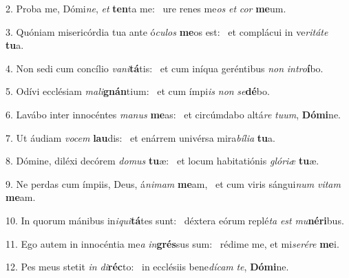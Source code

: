 2. Proba me, Dómi\textit{ne}, \textit{et} \textbf{ten}ta me: \ast\  ure renes me\textit{os} \textit{et} \textit{cor} \textbf{me}um.\

3. Quóniam misericórdia tua ante ó\textit{cu}\textit{los} \textbf{me}os est: \ast\  et complácui in ve\textit{ri}\textit{tá}\textit{te} \textbf{tu}a.\

4. Non sedi cum concílio \textit{va}\textit{ni}\textbf{tá}tis: \ast\  et cum iníqua geréntibus \textit{non} \textit{in}\textit{tro}\textbf{í}bo.\

5. Odívi ecclésiam \textit{ma}\textit{li}\textbf{gnán}tium: \ast\  et cum ímpi\textit{is} \textit{non} \textit{se}\textbf{dé}bo.\

6. Lavábo inter innocéntes \textit{ma}\textit{nus} \textbf{me}as: \ast\  et circúmdabo altá\textit{re} \textit{tu}\textit{um}, \textbf{Dó}\textbf{mi}ne.\

7. Ut áudiam \textit{vo}\textit{cem} \textbf{lau}dis: \ast\  et enárrem univérsa mira\textit{bí}\textit{li}\textit{a} \textbf{tu}a.\

8. Dómine, diléxi decórem \textit{do}\textit{mus} \textbf{tu}æ: \ast\  et locum habitatiónis \textit{gló}\textit{ri}\textit{æ} \textbf{tu}æ.\

9. Ne perdas cum ímpiis, Deus, á\textit{ni}\textit{mam} \textbf{me}am, \ast\  et cum viris sángui\textit{num} \textit{vi}\textit{tam} \textbf{me}am.\

10. In quorum mánibus in\textit{i}\textit{qui}\textbf{tá}tes sunt: \ast\  déxtera eórum replé\textit{ta} \textit{est} \textit{mu}\textbf{né}\textbf{ri}bus.\

11. Ego autem in innocéntia me\textit{a} \textit{in}\textbf{grés}sus sum: \ast\  rédime me, et mi\textit{se}\textit{ré}\textit{re} \textbf{me}i.\

12. Pes meus stetit \textit{in} \textit{di}\textbf{réc}to: \ast\  in ecclésiis bene\textit{dí}\textit{cam} \textit{te}, \textbf{Dó}\textbf{mi}ne.\

